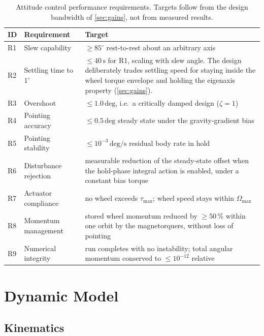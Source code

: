 \documentclass[conference,10pt,a4paper]{IEEEtran}
\newcommand{\unit}[1]{\ensuremath{\,\mathrm{#1}}}
\begin{document}
\begin{table}[!t]
\centering
\caption{Attitude control performance requirements. Targets follow from the
design bandwidth of \cref{sec:gains}, not from measured results.}
\label{tab:requirements}
\footnotesize
\begin{tabularx}{\textwidth}{@{}p{}p{}X@{}}
\toprule
\textbf{ID} & \textbf{Requirement} & \textbf{Target} \\
\midrule
R1 & Slew capability            & $\ge 85^\circ$ rest-to-rest about an arbitrary axis \\
R2 & Settling time to $1^\circ$ & $\le 40\unit{s}$ for R1, scaling with slew angle. The design deliberately trades settling speed for staying inside the wheel torque envelope and holding the eigenaxis property (\cref{sec:gains}). \\
R3 & Overshoot                  & $\le 1.0\unit{deg}$, i.e.\ a critically damped design ($\zeta=1$) \\
R4 & Pointing accuracy          & $\le 0.5\unit{deg}$ steady state under the gravity-gradient bias \\
R5 & Pointing stability         & $\le 10^{-3}\unit{deg/s}$ residual body rate in hold \\
R6 & Disturbance rejection      & measurable reduction of the steady-state offset when the hold-phase integral action is enabled, under a constant bias torque \\
R7 & Actuator compliance        & no wheel exceeds $\tau_\text{max}$; wheel speed stays within $\Omega_\text{max}$ \\
R8 & Momentum management        & stored wheel momentum reduced by $\ge50\,\%$ within one orbit by the magnetorquers, without loss of pointing \\
R9 & Numerical integrity        & run completes with no instability; total angular momentum conserved to $\le10^{-12}$ relative \\
\bottomrule
\end{tabularx}
\end{table}

\section{Dynamic Model}
\label{sec:model}

\subsection{Kinematics}
\end{document}
